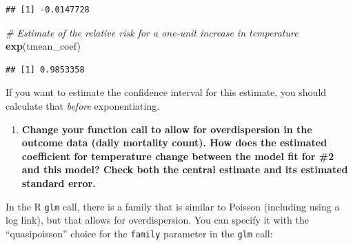 \documentclass[
]{book}
\newenvironment{Shaded}{\begin{snugshade}}{\end{snugshade}}
\newcommand{\CommentTok}[1]{\textcolor[rgb]{0.56,0.35,0.01}{\textit{#1}}}
\newcommand{\KeywordTok}[1]{\textcolor[rgb]{0.13,0.29,0.53}{\textbf{#1}}}
\newcommand{\NormalTok}[1]{#1}
\newcommand{\OperatorTok}[1]{\textcolor[rgb]{0.81,0.36,0.00}{\textbf{#1}}}
\newcommand{\StringTok}[1]{\textcolor[rgb]{0.31,0.60,0.02}{#1}}
\providecommand{\tightlist}{%
  \setlength{\itemsep}{0pt}\setlength{\parskip}{0pt}}
\begin{document}
\begin{Shaded}
\end{Shaded}

\begin{verbatim}
## [1] -0.0147728
\end{verbatim}

\begin{Shaded}
\begin{Highlighting}[]
\CommentTok{# Estimate of the relative risk for a one-unit increase in temperature}
\KeywordTok{exp}\NormalTok{(tmean_coef)}
\end{Highlighting}
\end{Shaded}

\begin{verbatim}
## [1] 0.9853358
\end{verbatim}

If you want to estimate the confidence interval for this estimate, you should
calculate that \emph{before} exponentiating.

\begin{enumerate}
\def\labelenumi{\arabic{enumi}.}
\setcounter{enumi}{2}
\tightlist
\item
  \textbf{Change your function call to allow for overdispersion in the outcome data
  (daily mortality count). How does the estimated coefficient for temperature
  change between the model fit for \#2 and this model? Check both the central
  estimate and its estimated standard error.}
\end{enumerate}

In the R \texttt{glm} call, there is a family that is similar to Poisson (including
using a log link), but that allows for overdispersion. You can specify it
with the ``quasipoisson'' choice for the \texttt{family} parameter in the \texttt{glm} call:
\end{document}
